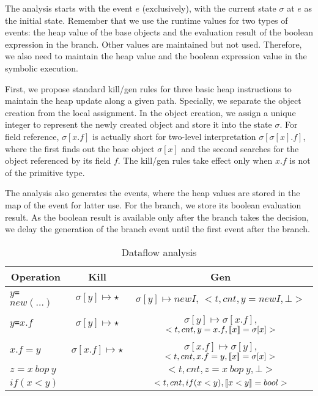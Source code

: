 The analysis starts with the event $e$ (exclusively), with the current state $\sigma$ at $e$ as the initial state. 
Remember that we use the runtime values for two types of events: the heap value of the base objects and the evaluation result of the boolean expression in the branch. 
Other values are maintained but not used. Therefore, we also need to maintain the heap value and the boolean expression value in the symbolic execution.

First, we propose standard kill/gen rules for three basic heap instructions to maintain the heap update along a given path. Specially, we separate the object creation from the local assignment. In the object creation, we assign a unique integer to represent the newly created object and store it into the state $\sigma$. For field reference, $\sigma[x.f]$ is actually short for two-level interpretation $\sigma[\sigma[x].f]$, where the first finds out the base object $\sigma[x]$ and the second searches for the object referenced by its field $f$. The kill/gen rules take effect only when $x.f$ is not of the primitive type.

The analysis also generates the events, where the heap values are stored in the map of the event for latter use. For the branch, we store its boolean evaluation result.
As the boolean result is available only after the branch takes the decision, we delay the generation of the branch event until the first event after the branch. 




\begin{table*}
\centering
\begin{tabular}{l|c|c}
\multicolumn{1}{c|}{Operation} & {Kill} & {Gen} \\
\hline
{\tt $y$=$new (...)$} 			&  $\sigma[y] \mapsto \star$		&  $\sigma[y] \mapsto newI$, $<t, cnt, y=newI, \bot>$\\
{\tt $y$=$x.f$} 			&   $\sigma[y]\mapsto \star$			&  $\sigma[y] \mapsto \sigma[x.f]$, $<t, cnt, y=x.f, \lbrack\!\lbrack x \rbrack\!\rbrack=\sigma[x]>$  \\
{\tt $x.f=y$} & $\sigma[x.f] \mapsto \star$		&  $\sigma[x.f] \mapsto \sigma[y]$, $<t, cnt, x.f=y, \lbrack\!\lbrack x \rbrack\!\rbrack=\sigma[x]>$ \\
{\tt $z=x\  bop\  y$} & 		&  $<t, cnt, z=x\  bop\  y, \bot>$ \\
{\tt $if(x<y)$} & 	  &  $<t, cnt, if(x<y), \lbrack\!\lbrack x<y \rbrack\!\rbrack=bool>$\\
\end{tabular}
\caption{\label{table:killgen}Dataflow analysis}
\end{table*}




